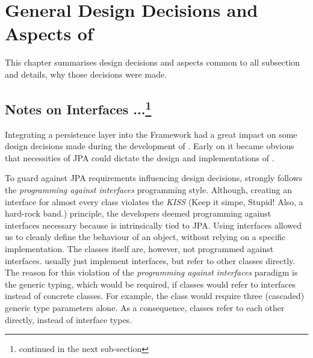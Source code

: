 \section[General Design Aspects]{General Design Decisions and Aspects of \salespoint{}}
This chapter summarises design decisions and aspects common to all \salespoint{} subsection and details, why those decisions were made.

\subsection{Notes on Interfaces ...\protect\footnote{continued in the next sub-section}}
Integrating a persistence layer into the \salespoint{} Framework had a great impact on some design decisions made during the development of \salespoint{}.
Early on it became obvious that necessities of JPA could dictate the design and implementations of \salespoint{}.

To guard against JPA requirements influencing design decisions, \salespoint{} strongly follows the \textit{programming against interfaces} programming style.
Although, creating an interface for almost every class violates the \textit{KISS} (Keep it simpe, Stupid! Also, a hard-rock band.) principle, the developers deemed programming against interfaces necessary because \salespoint{} is intrinsically tied to JPA.
Using interfaces allowed us to cleanly define the behaviour of an object, without relying on a specific implementation.
The classes itself are, however, not programmed against interfaces.
\salespoint{} usually just implement interfaces, but refer to other classes directly.
The reason for this violation of the \textit{programming against interfaces} paradigm is the generic typing, which would be required, if \salespoint{} classes would refer to interfaces instead of concrete classes.
For example, the  class would require three (cascaded) generic type parameters alone.
As a consequence, \salespoint{} classes refer to each other directly, instead of interface types.

